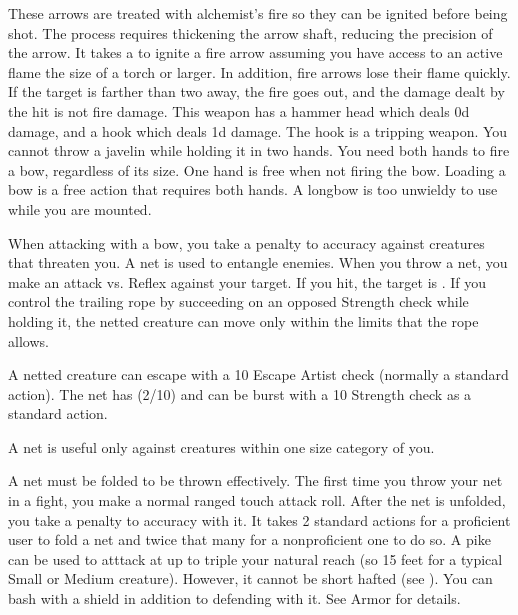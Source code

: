          These arrows are treated with alchemist's fire so they can be ignited before being shot.
        The process requires thickening the arrow shaft, reducing the precision of the arrow.
        It takes a  to ignite a fire arrow assuming you have access to an active flame the size of a torch or larger.
        In addition, fire arrows lose their flame quickly.
        If the target is farther than two  away, the fire goes out, and the damage dealt by the hit is not fire damage.
         This weapon has a hammer head which deals \plus0d damage, and a hook which deals \minus1d damage. The hook is a tripping weapon.
         You cannot throw a javelin while holding it in two hands.
         You need both hands to fire a bow, regardless of its size. One hand is free when not firing the bow. Loading a bow is a free action that requires both hands. A longbow is too unwieldy to use while you are mounted.
        \par When attacking with a bow, you take a  penalty to accuracy against creatures that threaten you.
         A net is used to entangle enemies. When you throw a net, you make an attack vs. Reflex against your target. If you hit, the target is \slowed. If you control the trailing rope by succeeding on an opposed Strength check while holding it, the netted creature can move only within the limits that the rope allows.
        \par A netted creature can escape with a  10 Escape Artist check (normally a standard action). The net has (2/10) and can be burst with a  10 Strength check as a standard action.
        \par A net is useful only against creatures within one size category of you.
        \par A net must be folded to be thrown effectively. The first time you throw your net in a fight, you make a normal ranged touch attack roll. After the net is unfolded, you take a  penalty to accuracy with it. It takes 2 standard actions for a proficient user to fold a net and twice that many for a nonproficient one to do so.
         A pike can be used to atttack at up to triple your natural reach (so 15 feet for a typical Small or Medium creature).
        However, it cannot be short hafted (see ).
         You can bash with a shield in addition to defending with it. See Armor for details.
